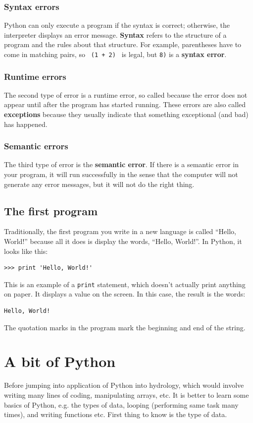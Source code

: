 \documentclass[10pt]{book}
\begin{document}
{\subsection{Syntax errors}
Python can only execute a program if the syntax is correct; otherwise, the interpreter displays an error message.
{\bf Syntax} refers to the structure of a program and the rules about that structure.  
For example, parentheses have to come in matching pairs, so \verb" (1 + 2) " is legal, but {\tt 8)} is a {\bf syntax error}.

\subsection{Runtime errors}
The second type of error is a runtime error, so called because the error does not appear until after the program has started running. These errors are also called {\bf exceptions} because they usually indicate that something exceptional (and bad) has happened.

\subsection{Semantic errors}
The third type of error is the {\bf semantic error}.  If there is a semantic error in your program, it will run successfully in the sense that the computer will not generate any error messages, but it will not do the right thing.  

\section{The first program}
Traditionally, the first program you write in a new language is called ``Hello, World!'' because all it does is display the words, ``Hello, World!''. In Python, it looks like this:

\beforeverb
\begin{verbatim}
>>> print 'Hello, World!'
\end{verbatim}
\afterverb
This is an example of a \verb"print" statement, which doesn't actually print anything on paper.  It displays a value on the screen.  In this case, the result is the words:
\beforeverb
\begin{verbatim}
Hello, World!
\end{verbatim}
\afterverb
The quotation marks in the program mark the beginning and end of the string.



\chapter{A bit of Python}
Before jumping into application of Python into hydrology, which would involve writing many lines of coding, manipulating arrays, etc. It is better to learn some basics of Python, e.g. the types of data, looping (performing same task many times), and writing functions etc. First thing to know is the type of data. 

}
\end{document}

